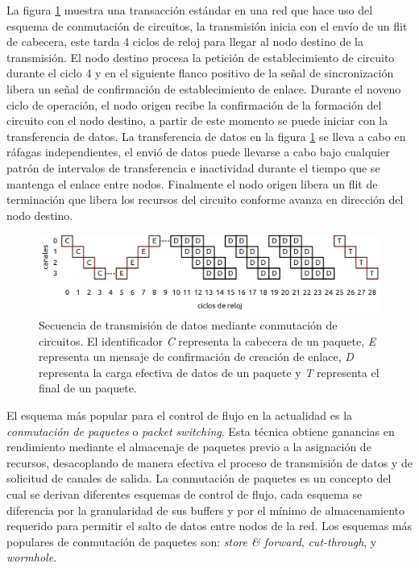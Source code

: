 La figura \ref{fig:ch1_circuit_switching} muestra una transacción estándar en una red que hace uso del esquema de conmutación de circuitos, la transmisión inicia con el envío de un flit de cabecera, este tarda 4 ciclos de reloj para llegar al nodo destino de la transmisión. El nodo destino procesa la petición de establecimiento de circuito durante el ciclo 4 y en el siguiente flanco positivo de la señal de sincronización libera un señal de confirmación de establecimiento de enlace. Durante el noveno ciclo de operación, el nodo origen recibe la confirmación de la formación del circuito con el nodo destino, a partir de este momento se puede iniciar con la transferencia de datos. La transferencia de datos en la figura \ref{fig:ch1_circuit_switching} se lleva a cabo en ráfagas independientes, el envió de datos puede llevarse a cabo bajo cualquier patrón de intervalos de transferencia e inactividad durante el tiempo que se mantenga el enlace entre nodos. Finalmente el nodo origen libera un flit de terminación que libera los recursos del circuito conforme avanza en dirección del nodo destino.

\begin{figure}
	\includegraphics[width=\linewidth]{figures/ch1_circuit_switching.png}
	\caption
		{	
			Secuencia de transmisión de datos mediante conmutación de circuitos. El identificador \textit{C} representa la cabecera de un paquete, \textit{E} representa un mensaje de confirmación de creación de enlace, \textit{D} representa la carga efectiva de datos de un paquete y \textit{T} representa el final de un paquete.
		}
	\label{fig:ch1_circuit_switching}
\end{figure}

El esquema más popular para el control de flujo en la actualidad es la \textit{conmutación de paquetes} o \textit{packet switching}. Esta técnica obtiene ganancias en rendimiento mediante el almacenaje de paquetes previo a la asignación de recursos, desacoplando de manera efectiva el proceso de transmisión de datos y de solicitud de canales de salida. La conmutación de paquetes es un concepto del cual se derivan diferentes esquemas de control de flujo, cada esquema se diferencia por la granularidad de sus buffers y por el mínimo de almacenamiento requerido para permitir el salto de datos entre nodos de la red. Los esquemas más populares de conmutación de paquetes son: \textit{store \& forward}, \textit{cut-through}, y \textit{wormhole}.

